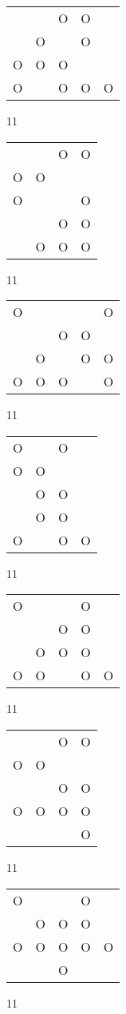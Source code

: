 \begin{tabular}{|m{0.2cm}m{0.2cm}m{0.2cm}m{0.2cm}m{0.2cm}|}\hline
 & &O&O& \\
 &O& &O& \\
O&O&O& & \\
O& &O&O&O\\
\hline\end{tabular}11
\begin{tabular}{|m{0.2cm}m{0.2cm}m{0.2cm}m{0.2cm}|}\hline
 & &O&O\\
O&O& & \\
O& & &O\\
 & &O&O\\
 &O&O&O\\
\hline\end{tabular}11
\begin{tabular}{|m{0.2cm}m{0.2cm}m{0.2cm}m{0.2cm}m{0.2cm}|}\hline
O& & & &O\\
 & &O&O& \\
 &O& &O&O\\
O&O&O& &O\\
\hline\end{tabular}11
\begin{tabular}{|m{0.2cm}m{0.2cm}m{0.2cm}m{0.2cm}|}\hline
O& &O& \\
O&O& & \\
 &O&O& \\
 &O&O& \\
O& &O&O\\
\hline\end{tabular}11
\begin{tabular}{|m{0.2cm}m{0.2cm}m{0.2cm}m{0.2cm}m{0.2cm}|}\hline
O& & &O& \\
 & &O&O& \\
 &O&O&O& \\
O&O& &O&O\\
\hline\end{tabular}11
\begin{tabular}{|m{0.2cm}m{0.2cm}m{0.2cm}m{0.2cm}|}\hline
 & &O&O\\
O&O& & \\
 & &O&O\\
O&O&O&O\\
 & & &O\\
\hline\end{tabular}11
\begin{tabular}{|m{0.2cm}m{0.2cm}m{0.2cm}m{0.2cm}m{0.2cm}|}\hline
O& & &O& \\
 &O&O&O& \\
O&O&O&O&O\\
 & &O& & \\
\hline\end{tabular}11
